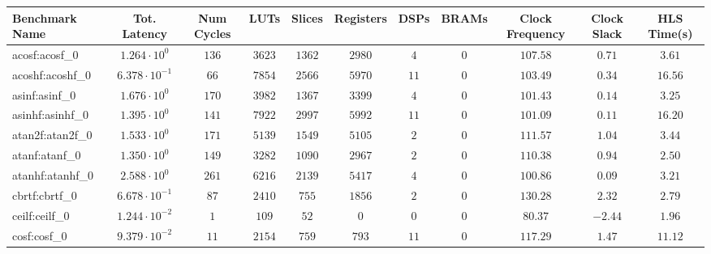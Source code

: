 \begin{tabular}{|l|c|c|c|c|c|c|c|c|c|c|}
\hline
Benchmark Name               & Tot. Latency            & Num Cycles & LUTs       & Slices    & Registers & DSPs    & BRAMs & Clock Frequency & Clock Slack & HLS Time(s) \\
\hline
acosf:acosf\_0               & $ 1.264 \cdot 10^{0}  $ & $ 136    $ & $ 3623   $ & $ 1362  $ & $ 2980  $ & $ 4   $ & $ 0 $ & $ 107.58      $ & $ 0.71    $ & $ 3.61    $ \\
acoshf:acoshf\_0             & $ 6.378 \cdot 10^{-1} $ & $ 66     $ & $ 7854   $ & $ 2566  $ & $ 5970  $ & $ 11  $ & $ 0 $ & $ 103.49      $ & $ 0.34    $ & $ 16.56   $ \\
asinf:asinf\_0               & $ 1.676 \cdot 10^{0}  $ & $ 170    $ & $ 3982   $ & $ 1367  $ & $ 3399  $ & $ 4   $ & $ 0 $ & $ 101.43      $ & $ 0.14    $ & $ 3.25    $ \\
asinhf:asinhf\_0             & $ 1.395 \cdot 10^{0}  $ & $ 141    $ & $ 7922   $ & $ 2997  $ & $ 5992  $ & $ 11  $ & $ 0 $ & $ 101.09      $ & $ 0.11    $ & $ 16.20   $ \\
atan2f:atan2f\_0             & $ 1.533 \cdot 10^{0}  $ & $ 171    $ & $ 5139   $ & $ 1549  $ & $ 5105  $ & $ 2   $ & $ 0 $ & $ 111.57      $ & $ 1.04    $ & $ 3.44    $ \\
atanf:atanf\_0               & $ 1.350 \cdot 10^{0}  $ & $ 149    $ & $ 3282   $ & $ 1090  $ & $ 2967  $ & $ 2   $ & $ 0 $ & $ 110.38      $ & $ 0.94    $ & $ 2.50    $ \\
atanhf:atanhf\_0             & $ 2.588 \cdot 10^{0}  $ & $ 261    $ & $ 6216   $ & $ 2139  $ & $ 5417  $ & $ 4   $ & $ 0 $ & $ 100.86      $ & $ 0.09    $ & $ 3.21    $ \\
cbrtf:cbrtf\_0               & $ 6.678 \cdot 10^{-1} $ & $ 87     $ & $ 2410   $ & $ 755   $ & $ 1856  $ & $ 2   $ & $ 0 $ & $ 130.28      $ & $ 2.32    $ & $ 2.79    $ \\
ceilf:ceilf\_0               & $ 1.244 \cdot 10^{-2} $ & $ 1      $ & $ 109    $ & $ 52    $ & $ 0     $ & $ 0   $ & $ 0 $ & $ 80.37       $ & $ -2.44   $ & $ 1.96    $ \\
cosf:cosf\_0                 & $ 9.379 \cdot 10^{-2} $ & $ 11     $ & $ 2154   $ & $ 759   $ & $ 793   $ & $ 11  $ & $ 0 $ & $ 117.29      $ & $ 1.47    $ & $ 11.12   $ \\

\end{tabular}
